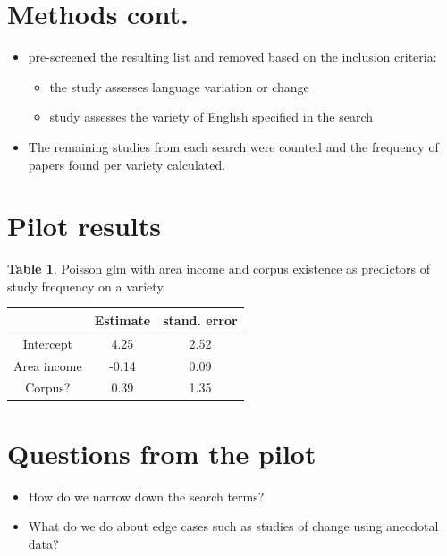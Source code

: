 \documentclass[a0paper,fleqn]{betterposter}
\begin{document}
{
	\section{Methods cont.}	
\begin{itemize}
	\item pre-screened the resulting list and removed based on the inclusion criteria:
	\begin{itemize}
		\item the study assesses language variation or change
		\item study assesses the variety of English specified in the search
	\end{itemize}
	\item The remaining studies from each search were counted and the frequency of papers found per variety calculated.

\end{itemize}



\section{Pilot results}


\textbf{Table 1}. Poisson glm with area income and corpus existence as predictors of study frequency on a variety.

\begin{tabular}{ c c c }
	& Estimate & stand. error\\
	\hline
	Intercept & 4.25 & 2.52	\\
	Area income & -0.14 & 0.09\\
	Corpus? & 0.39 & 1.35 \\
\hline
\end{tabular}

\section{Questions from the pilot}
\begin{itemize}
	\item How do we narrow down the search terms?
	\item What do we do about edge cases such as studies of change using anecdotal data?
\end{itemize}



}
\end{document}
